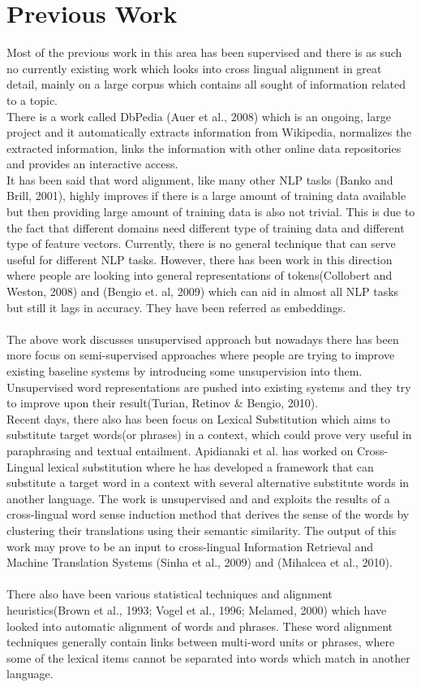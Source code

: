 \documentclass{article}
\begin{document}
\section{Previous Work}
Most of the previous work in this area has been supervised and there is as such no currently existing work which looks into cross lingual alignment in great detail, mainly on a large corpus which contains all sought of information related to a topic.\\
There is a work called DbPedia (Auer et al., 2008) which is an ongoing, large project and it automatically extracts information from Wikipedia, normalizes the extracted information, links the information with other online data repositories and provides an interactive access.\\
It has been said that word alignment, like many other NLP tasks (Banko and Brill, 2001), highly improves if there is a large amount of training data available but then providing large amount of training data is also not trivial. This is due to the fact that different domains need different type of training data and different type of feature vectors. Currently, there is no general technique that can serve useful for different NLP tasks. However, there has been work in this direction where people are looking into general representations of tokens(Collobert and Weston, 2008) and (Bengio et. al, 2009) which can aid in almost all NLP tasks but still it lags in accuracy. They have been referred as embeddings.\\\\
The above work discusses unsupervised approach but nowadays there has been more focus on semi-supervised approaches where people are trying to improve existing baseline systems by introducing some unsupervision into them. Unsupervised word representations are pushed into existing systems and they try to improve upon their result(Turian, Retinov \& Bengio, 2010).\\
Recent days, there also has been focus on Lexical Substitution which aims to substitute target words(or phrases) in a context, which could prove very useful in paraphrasing and textual entailment. Apidianaki et al. has worked on Cross-Lingual lexical substitution where he has developed a framework that can substitute a target word in a context with several alternative substitute words in another language. The work is unsupervised and and exploits the results of a cross-lingual word sense induction method that derives the sense of the words by clustering their translations using their semantic similarity. The output of this work may prove to be an input to cross-lingual Information Retrieval and Machine Translation Systems (Sinha et al., 2009) and (Mihalcea et al., 2010).\\\\
There also have been various statistical techniques and alignment heuristics(Brown et al., 1993; Vogel et al., 1996; Melamed, 2000) which have looked into automatic alignment of words and phrases. These word alignment techniques generally contain links between multi-word units or phrases, where some of the lexical items cannot be separated into words which match in another language.
\end{document}
